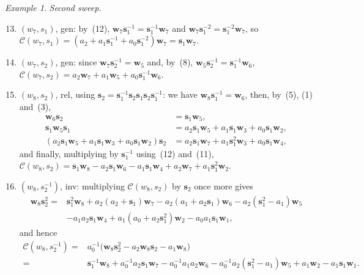 \documentclass[11pt, reqno]{amsart}
\newcommand{\cC}{\mathcal{C}}
\numberwithin{equation}{section}
\theoremstyle{remark}
\newtheorem{example}[theorem]{Example}
\begin{document}
\begin{example}
{				\smallskip
				\noindent\emph{Second sweep.}
				\begin{enumerate}\setcounter{enumi}{12}
					\item $(w_7,s_1)$, \textsf{gen}: by~(12),
					$\mathbf w_7\mathbf s_1^{-1}=\mathbf s_1^{-1}\mathbf w_7$ and
					$\mathbf w_7\mathbf s_1^{-2}=\mathbf s_1^{-2}\mathbf w_7$, so\\
					$\cC(w_7,s_1)=(a_2+a_1\mathbf s_1^{-1}+a_0\mathbf s_1^{-2})\mathbf w_7
					=\mathbf s_1\mathbf w_7.$
					\item $(w_7,s_2)$, \textsf{gen}: since $\mathbf w_7\mathbf s_2^{-1}=\mathbf w_5$
					and, by~(8), $\mathbf w_5\mathbf s_2^{-1}=\mathbf s_1^{-1}\mathbf w_6$,\\
					$\cC(w_7,s_2)=a_2\mathbf w_7+a_1\mathbf w_5+a_0\mathbf s_1^{-1}\mathbf w_6.$
					\item $(w_8,s_2)$, \textsf{rel}, using
					$\mathbf s_2=\mathbf s_1^{-1}\mathbf s_2\mathbf s_1\mathbf s_2\mathbf s_1^{-1}$:
					we have $\mathbf w_8\mathbf s_1^{-1}=\mathbf w_6$, then, by~(5), (1) and~(3),
					\begin{align*}
						\mathbf w_6\mathbf s_2&=\mathbf s_1\mathbf w_5,\\
						\mathbf s_1\mathbf w_5\mathbf s_1&=a_2\mathbf s_1\mathbf w_5+a_1\mathbf s_1\mathbf w_3+a_0\mathbf s_1\mathbf w_2,\\
						(a_2\mathbf s_1\mathbf w_5+a_1\mathbf s_1\mathbf w_3+a_0\mathbf s_1\mathbf w_2)\mathbf s_2
						&=a_2\mathbf s_1\mathbf w_7+a_1\mathbf s_1^2\mathbf w_3+a_0\mathbf s_1\mathbf w_4,
					\end{align*}
					and finally, multiplying by $\mathbf s_1^{-1}$ using~(12) and~(11),\\
					$\cC(w_8,s_2)=\mathbf s_1\mathbf w_8-a_2\mathbf s_1\mathbf w_6-a_1\mathbf s_1\mathbf w_4
					+a_2\mathbf w_7+a_1\mathbf s_1^2\mathbf w_2.$
					\item $(w_8,s_2^{-1})$, \textsf{inv}: multiplying $\cC(w_8,s_2)$ by
					$\mathbf s_2$ once more gives
					\begin{align*}
						\mathbf w_8\mathbf s_2^2={}&\mathbf s_1^2\mathbf w_8+a_2(a_2+\mathbf s_1)\mathbf w_7
						-a_2(a_1+a_2\mathbf s_1)\mathbf w_6-a_2(\mathbf s_1^2-a_1)\mathbf w_5\\
						&-a_1a_2\mathbf s_1\mathbf w_4+a_1(a_0+a_2\mathbf s_1^2)\mathbf w_2-a_0a_1\mathbf s_1\mathbf w_1,
					\end{align*}
					and hence
					\begin{align*}
						\cC(w_8,s_2^{-1})={}&a_0^{-1}\big(\mathbf w_8\mathbf s_2^2-a_2\mathbf w_8\mathbf s_2-a_1\mathbf w_8\big)\\
						={}&\mathbf s_1^{-1}\mathbf w_8+a_0^{-1}a_2\mathbf s_1\mathbf w_7-a_0^{-1}a_1a_2\mathbf w_6
						-a_0^{-1}a_2(\mathbf s_1^2-a_1)\mathbf w_5+a_1\mathbf w_2-a_1\mathbf s_1\mathbf w_1.
					\end{align*}
				\end{enumerate}
				
}
\end{example}
\end{document}
